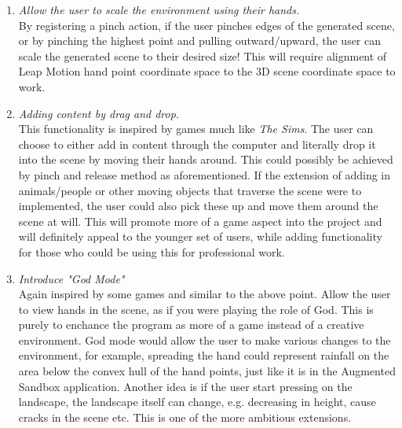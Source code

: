 \documentclass[11pt]{article}
\begin{document}
\begin{enumerate}
	\item \textit{Allow the user to scale the environment using their hands.} \\
		  By registering a pinch action, if the user pinches edges of the
		  generated scene, or by pinching the highest point and pulling 
		  outward/upward, the user can scale the generated scene to their 
		  desired size! This will require alignment of Leap Motion hand point 
		  coordinate space to the 3D scene coordinate space to work.
	\item \textit{Adding content by drag and drop.}\\
		  This functionality is inspired by games much like \textit{The Sims}.
		  The user can choose to either add in content through the computer and
		  literally drop it into the scene by moving their hands around. This
		  could possibly be achieved by pinch and release method as aforementioned. 
		  If the extension of adding in animals/people or other moving objects
		  that traverse the scene were to implemented, the user could also
		  pick these up and move them around the scene at will. This will 
		  promote more of a game aspect into the project and will definitely
		  appeal to the younger set of users, while adding functionality for
		  those who could be using this for professional work.
	\item \textit{Introduce "God Mode"}\\
		  Again inspired by some games and similar to the above point. Allow
		  the user to view hands in the scene, as if you were playing the
		  role of God. This is purely to enchance the program as more of a game
		  instead of a creative environment. God mode would allow the user to
		  make various changes to the environment, for example, spreading the hand
		  could represent rainfall on the area below the convex hull of the hand
		  points, just like it is in the Augmented Sandbox application.
		  Another idea is if the user start  pressing on the landscape, the
		  landscape itself can change, e.g. decreasing in height, cause cracks in
		  the scene etc. This is one of the more ambitious extensions.
\end{enumerate}
\end{document}
